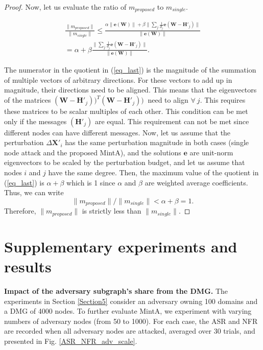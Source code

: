 \documentclass[conference,compsoc]{IEEEtran}
\begin{document}
\begin{proof}
\par Now, let us evaluate the ratio of $m_{proposed}$ to $m_{single}$.
\begin{small}
\begin{multline}\label{eq_last}
 \frac{ \|m_{proposed}\| }{ \|m_{single}\| }\leq
 \frac{\alpha\|\boldsymbol{e}(\boldsymbol{W})\|+\beta\|\sum_j\frac{1}{d_j}\boldsymbol{e}(\boldsymbol{W}-\boldsymbol{H'}_j)\|}{\|\boldsymbol{e}(\boldsymbol{W})\|}
 \\
 =
 \alpha+
 \beta \frac{\|\sum_j\frac{1}{d_j}\boldsymbol{e}(\boldsymbol{W}-\boldsymbol{H'}_j)\|}{\|\boldsymbol{e}(\boldsymbol{W})\|}. 
\end{multline}
\end{small}
\noindent The numerator in the quotient in (\ref{eq_last}) is the magnitude of the summation of multiple vectors of arbitrary directions. For these vectors to add up in magnitude, their directions need to be aligned. This means that the eigenvectors of the matrices 
$(\boldsymbol{W}-\boldsymbol{H'}_j))^{T}(\boldsymbol{W}-\boldsymbol{H'}_j))~$ need to align $\forall~j$. This requires these matrices to be scalar multiples of each other. This condition can be met only if the messages $(\boldsymbol{H'}_j)$ are equal. This requirement can not be met since different nodes can have different messages. Now, let us assume that the perturbation $\Delta \boldsymbol{X'}_i$ has the same perturbation magnitude in both cases (single node attack and the proposed MintA), and the solutions $\boldsymbol{e}$ are unit-norm eigenvectors to be scaled by the perturbation budget, and let us assume that nodes $i$ and $j$ have the same degree. Then, the maximum value of the quotient in (\ref{eq_last}) is $\alpha +\beta$ which is 1 since $\alpha$ and $\beta$ are weighted average coefficients. Thus, we can write
\begin{equation}
\|m_{proposed}\| / \|m_{single}\| <
 \alpha +\beta= 1. 
\end{equation}
Therefore, $\|m_{proposed}\|$ is strictly less than $\|m_{single}\|$.
\end{proof}

\section{Supplementary experiments and results}
\label{appendixB}

\par \textbf{Impact of the adversary subgraph's share from the DMG.} The experiments in Section \ref{Section5} consider an adversary owning 100 domains and a DMG of 4000 nodes. To further evaluate MintA, we experiment with varying numbers of adversary nodes (from 50 to 1000). For each case, the ASR and NFR are recorded when all adversary nodes are attacked, averaged over 30 trials, and presented in Fig. \ref{ASR_NFR_adv_scale}.
\end{document}

